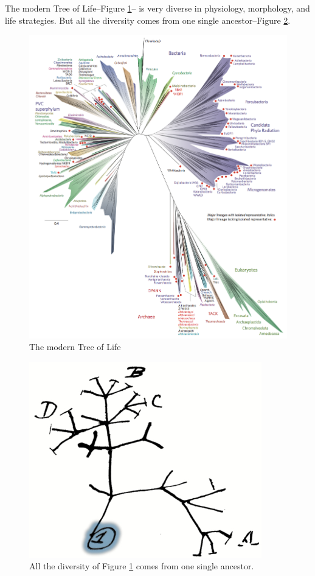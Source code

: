 \documentclass[]{article}
\begin{document}
The modern Tree of Life--Figure \ref{fig:TOL4}\cite{hug2016new}-- is very diverse in physiology, morphology, and life strategies. But all the diversity  comes from one single ancestor--Figure \ref{fig:TOL_root}.
\begin{figure}[H]
	\caption{The modern Tree of Life}\label{fig:TOL4}
	\includegraphics[width=\textwidth]{A_Novel_Representation_Of_The_Tree_Of_Life}
\end{figure}

\begin{figure}[H]
	\caption{All the diversity of Figure \ref{fig:TOL4} comes from one single ancestor.}\label{fig:TOL_root}
	\includegraphics[width=0.9\textwidth]{TOL_root}
\end{figure}
\end{document}
